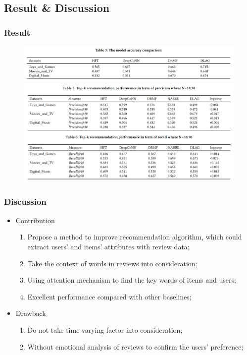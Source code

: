 \documentclass{../presentation}
\begin{document}
    \subsection{Result \& Discussion}

    \begin{frame}
        \frametitle{Result}

        \begin{figure}
            \includegraphics[width=0.7\linewidth]{img/gp01-3.png}
            \includegraphics[width=0.7\linewidth]{img/gp01-4.png}
        \end{figure}

    \end{frame}

    \begin{frame}
        \frametitle{Discussion}

        \begin{itemize}
            \item Contribution
            \begin{enumerate}
                \item Propose a method to improve recommendation algorithm, which could extract users' and items' attributes with review data;
                \item Take the context of words in reviews into consideration;
                \item Using attention mechanism to find the key words of items and users;
                \item Excellent performance compared with other baselines;
            \end{enumerate}
            \item Drawback
            \begin{enumerate}
                \item Do not take time varying factor into consideration;
                \item Without emotional analysis of reviews to confirm the users' preference;
            \end{enumerate}
        \end{itemize}

    \end{frame}
\end{document}
